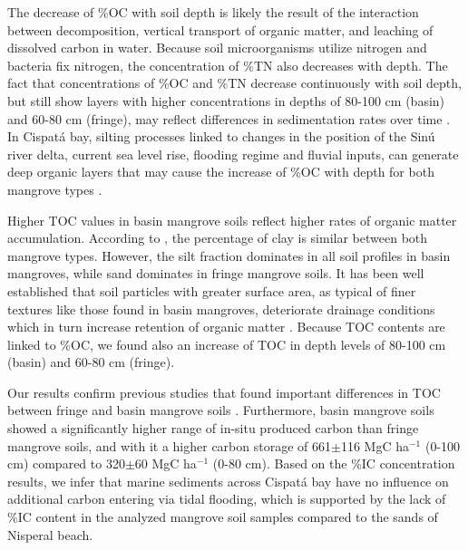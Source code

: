 The decrease of \%OC with soil depth is likely the result of the interaction between decomposition, vertical transport of organic matter, and leaching of dissolved carbon in water. Because soil microorganisms utilize nitrogen and bacteria fix nitrogen, the concentration of \%TN also decreases with depth. The fact that concentrations of \%OC and \%TN decrease continuously with soil depth, but still show layers with higher concentrations in depths of 80-100 cm (basin) and 60-80 cm (fringe), may reflect differences in sedimentation rates over time \citep{Bolivar2015}. In Cispat\'{a} bay, silting processes linked to changes in the position of the Sin\'{u} river delta, current sea level rise, flooding regime and fluvial inputs, can generate deep organic layers that may cause the increase of \%OC with depth for both mangrove types \citep{suarez2004}. 

Higher TOC values in basin mangrove soils reflect higher rates of organic matter accumulation. According to  \citet{Bolivar2015}, the percentage of clay is similar between both mangrove types. However, the silt fraction dominates in all soil profiles in basin mangroves, while sand dominates in fringe mangrove soils. It has been well established that soil particles with greater surface area, as typical of finer textures like those found in basin mangroves, deteriorate drainage conditions which in turn increase retention of organic matter \citep{prasad2008}. Because TOC contents are linked to \%OC, we found also an increase of TOC in depth levels of 80-100 cm (basin) and 60-80 cm (fringe).

Our results confirm previous studies that found important differences in TOC between fringe and basin mangrove soils \citep{Bolivar2015}. Furthermore, basin mangrove soils showed a significantly higher range of in-situ produced carbon than fringe mangrove soils, and with it a higher carbon storage of 661$\pm$116 MgC ha$^{-1}$ (0-100 cm) compared to 320$\pm$60 MgC ha$^{-1}$ (0-80 cm). Based on the \%IC concentration results, we infer that marine sediments across Cispat\'{a} bay have no influence on additional carbon entering via tidal flooding, which is supported by the lack of \%IC content in the analyzed mangrove soil samples compared to the sands of Nisperal beach.

